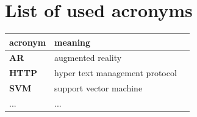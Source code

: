 \chapter*{List of used acronyms }

\begin{tabular}{l|l|l}
  {\bf acronym} & {\bf meaning}  \\ \hline
  {\bf AR} & augmented reality \\
  {\bf HTTP} & hyper text management protocol \\
  {\bf SVM} & support vector machine \\
  ... & ... \\
\end{tabular}